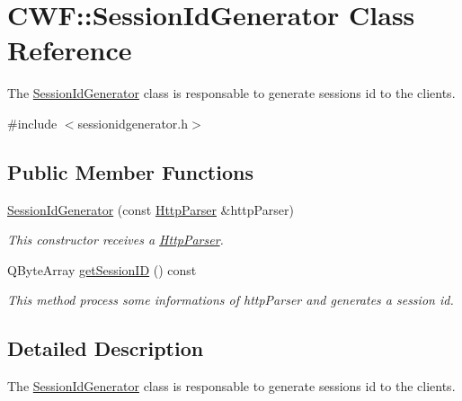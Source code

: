 \hypertarget{class_c_w_f_1_1_session_id_generator}{\section{C\+W\+F\+:\+:Session\+Id\+Generator Class Reference}
\label{class_c_w_f_1_1_session_id_generator}
}


The \hyperlink{class_c_w_f_1_1_session_id_generator}{Session\+Id\+Generator} class is responsable to generate sessions id to the clients.  




{\ttfamily \#include $<$sessionidgenerator.\+h$>$}

\subsection*{Public Member Functions}
\begin{DoxyCompactItemize}
\item 
\hyperlink{class_c_w_f_1_1_session_id_generator_a1f7d978172454fe8b395c06b783dc355}{Session\+Id\+Generator} (const \hyperlink{class_c_w_f_1_1_http_parser}{Http\+Parser} \&http\+Parser)
\begin{DoxyCompactList}\small\item\em This constructor receives a \hyperlink{class_c_w_f_1_1_http_parser}{Http\+Parser}. \end{DoxyCompactList}\item 
Q\+Byte\+Array \hyperlink{class_c_w_f_1_1_session_id_generator_a8aada44d07a73e07c4172725519c64f9}{get\+Session\+I\+D} () const 
\begin{DoxyCompactList}\small\item\em This method process some informations of http\+Parser and generates a session id. \end{DoxyCompactList}\end{DoxyCompactItemize}


\subsection{Detailed Description}
The \hyperlink{class_c_w_f_1_1_session_id_generator}{Session\+Id\+Generator} class is responsable to generate sessions id to the clients. 

